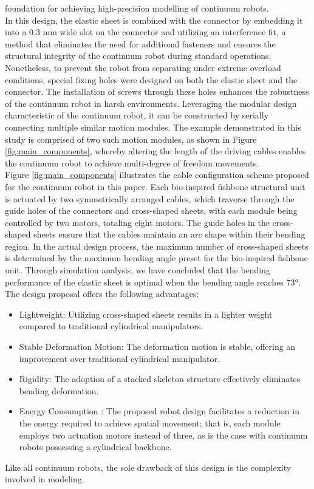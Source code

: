 foundation for achieving high-precision modelling of continuum robots. \\
In this design, the elastic sheet is combined with the connector by embedding it into a 0.3 mm wide slot on the connector 
and utilizing an interference fit, a method that eliminates the need for additional fasteners and ensures the structural 
integrity of the continuum robot during standard operations. Nonetheless, to prevent the robot from separating under 
extreme overload conditions, special fixing holes were designed on both the elastic sheet and the connector. The 
installation of screws through these holes enhances the robustness of the continuum robot in harsh environments. 
Leveraging the modular design characteristic of the continuum robot, it can be constructed by serially connecting 
multiple similar motion modules. The example demonstrated in this study is comprised of two such motion modules, as 
shown in Figure \ref{fig:main_components}, whereby altering the length of the driving cables enables the continuum 
robot to achieve multi-degree of freedom movements. \\
Figure \ref{fig:main_components} illustrates the cable configuration scheme proposed for the continuum robot in this 
paper. Each bio-inspired fishbone structural unit is actuated by two symmetrically arranged cables, which traverse 
through the guide holes of the connectors and cross-shaped sheets, with each module being controlled by two motors, 
totaling eight motors. The guide holes in the cross-shaped sheets ensure that the cables maintain an arc shape within 
their bending region. In the actual design process, the maximum number of cross-shaped sheets is determined by the 
maximum bending angle preset for the bio-inspired fishbone unit. Through simulation analysis, we have concluded that 
the bending performance of the elastic sheet is optimal when the bending angle reaches 73°. \\
The design proposal offers the following advantages: \\
\begin{itemize}
    \item Lightweight: Utilizing cross-shaped sheets results in a lighter weight compared to traditional cylindrical manipulators.
    \item Stable Deformation Motion: The deformation motion is stable, offering an improvement over traditional cylindrical manipulator.
    \item Rigidity: The adoption of a stacked skeleton structure effectively eliminates bending deformation.
    \item Energy Consumption \cite{bio_noval_method}: The proposed robot design facilitates a reduction in the energy required to achieve spatial movement; that is, each module employs two actuation motors instead of three, as is the case with continuum robots possessing a cylindrical backbone.
\end{itemize}
Like all continuum robots, the sole drawback of this design is the complexity involved in modeling.
